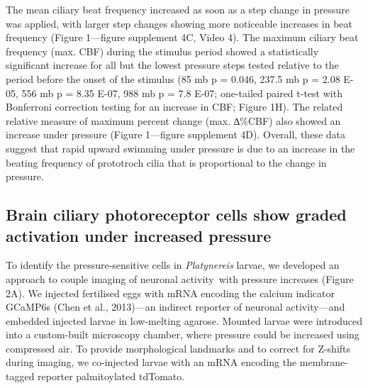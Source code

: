 \documentclass[
  11pt,
]{article}
\begin{document}
The mean ciliary beat frequency increased as soon as a step change in
pressure was applied, with larger step changes showing more noticeable
increases in beat frequency (Figure 1---figure supplement 4C, Video 4).
The maximum ciliary beat frequency (max. CBF) during the stimulus period
showed a statistically significant increase for all but the lowest
pressure steps tested relative to the period before the onset of the
stimulus (85 mb p = 0.046, 237.5 mb p = 2.08 E-05, 556 mb p = 8.35 E-07,
988 mb p = 7.8 E-07; one-tailed paired t-test with Bonferroni correction
testing for an increase in CBF; Figure 1H). The related relative measure
of maximum percent change (max. ∆\%CBF) also showed an increase under
pressure (Figure 1---figure supplement 4D). Overall, these data suggest
that rapid upward swimming under pressure is due to an increase in the
beating frequency of prototroch cilia that is proportional to the change
in pressure.

\subsection{Brain ciliary photoreceptor cells show graded activation
under increased
pressure}\label{brain-ciliary-photoreceptor-cells-show-graded-activation-under-increased-pressure}

To identify the pressure-sensitive cells in \emph{Platynereis} larvae,
we developed an approach to couple imaging of neuronal activity~with
pressure increases (Figure 2A). We injected fertilised eggs with mRNA
encoding the calcium indicator GCaMP6s (Chen et al., 2013)---an indirect
reporter of neuronal activity---and embedded injected larvae in
low-melting agarose. Mounted larvae were introduced into a custom-built
microscopy chamber, where pressure could be increased using compressed
air. To provide morphological landmarks and to correct for Z-shifts
during imaging, we co-injected larvae with an mRNA encoding the
membrane-tagged reporter palmitoylated tdTomato.
\end{document}
